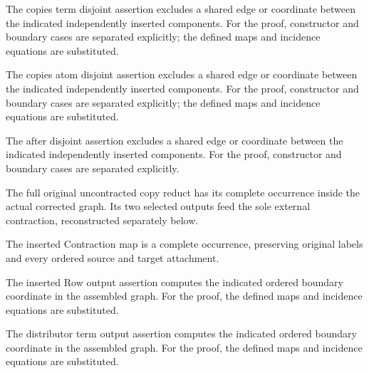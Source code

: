 The copies term disjoint assertion excludes a shared edge or coordinate between the indicated independently inserted components.
For the proof, constructor and boundary cases are separated explicitly; the defined maps and incidence equations are substituted.
\par{}

The copies atom disjoint assertion excludes a shared edge or coordinate between the indicated independently inserted components.
For the proof, constructor and boundary cases are separated explicitly; the defined maps and incidence equations are substituted.
\par{}

The after disjoint assertion excludes a shared edge or coordinate between the indicated independently inserted components.
For the proof, constructor and boundary cases are separated explicitly.
\par{}

The full original uncontracted copy reduct has its complete occurrence inside the actual corrected graph. Its two selected outputs feed the sole external contraction, reconstructed separately below.
\par{}

The inserted Contraction map is a complete occurrence, preserving original labels and every ordered source and target attachment.
\par{}

The inserted Row output assertion computes the indicated ordered boundary coordinate in the assembled graph.
For the proof, the defined maps and incidence equations are substituted.
\par{}

The distributor term output assertion computes the indicated ordered boundary coordinate in the assembled graph.
For the proof, the defined maps and incidence equations are substituted.
\par{}


